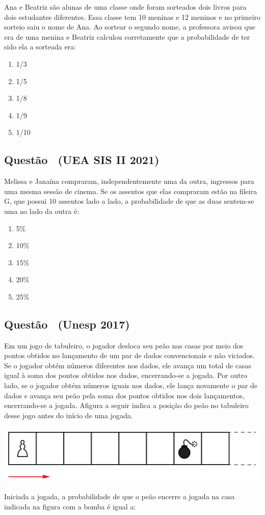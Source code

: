 \documentclass[12pt]{article}
\newcounter{questao}
\newcommand{\novaquestao}[1]{%
	\stepcounter{questao}%
	\subsection*{Questão \thequestao\ (#1)}%
}
\begin{document}
\begin{multicols}{2}
			Ana e Beatriz são alunas de uma classe onde foram sorteados
			dois livros para dois estudantes diferentes. Essa classe tem 10
			meninas e 12 meninos e no primeiro sorteio saiu o nome de Ana. Ao
			sortear o segundo nome, a professora avisou que era de uma menina
			e Beatriz calculou corretamente que a probabilidade de ter sido ela
			a sorteada era:
			
			\begin{enumerate}[label=(\alph*), noitemsep]
				\item {1}/{3}
				\item {1}/{5}
				\item {1}/{8}
				\item {1}/{9}  %
				\item {1}/{10}
			\end{enumerate}
			
		\novaquestao{UEA SIS II 2021}
		
			Melissa e Janaína compraram, independentemente uma da
			outra, ingressos para uma mesma sessão de cinema. Se os
			assentos que elas compraram estão na fileira G, que possui 10
			assentos lado a lado, a probabilidade de que as duas sentem-se
			uma ao lado da outra é:
			
			\begin{enumerate}[label=(\alph*), noitemsep]
				\item 5\%
				\item 10\%
				\item 15\%
				\item 20\%  %
				\item 25\%
			\end{enumerate}
		
		\novaquestao{Unesp 2017}
		
			Em um jogo de tabuleiro, o jogador desloca seu peão nas casas por meio dos pontos obtidos no lançamento de um par de dados convencionais e não viciados. Se o jogador obtém números diferentes nos dados, ele avança um total de casas igual à soma dos pontos obtidos nos dados, encerrando-se a jogada. Por outro lado, se o jogador obtém números iguais nos dados, ele lança novamente o par de dados e avança seu peão pela soma dos pontos obtidos nos dois lançamentos, encerrando-se a jogada. Afigura a seguir indica a posição do peão no tabuleiro desse jogo antes do início 
			de uma jogada.
			
			\begin{center}
				\includegraphics[scale=0.5]{imagens/unesp-2017.png}
			\end{center} Iniciada a jogada, a probabilidade de que o peão encerre a jogada na casa indicada na figura com a bomba é igual a:
			

\end{multicols}
\end{document}
